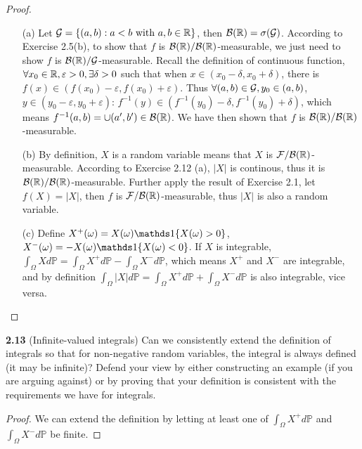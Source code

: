 \begin{proof}
\begin{enumerate}
    \item[(a)] Let $\mathcal{G}=\left\{ (a,b): a<b \text{ with } a,b\in \mathbb{R} \right\}$, then $\mathcal{B}(\mathbb{R}) = \sigma(\mathcal{G})$. According to Exercise 2.5(b), to show that $f$ is $\mathcal{B}(\mathbb{R})/\mathcal{B}(\mathbb{R})$-measurable, we just need to show $f$ is $\mathcal{B}(\mathbb{R})/\mathcal{G}$-measurable. Recall the definition of continuous function, $\forall x_0 \in \mathbb{R}, \varepsilon>0, \exists \delta>0$ such that when $x \in (x_0-\delta,x_0+\delta)$, there is $f(x)\in (f(x_0)-\varepsilon,f(x_0)+\varepsilon)$. Thus $\forall (a,b)\in \mathcal{G}, y_0 \in (a,b)$, $y \in (y_0 - \varepsilon, y_0+\varepsilon)$: $f^{-1}(y) \in (f^{-1}(y_0)-\delta,f^{-1}(y_0)+\delta)$, which means $f^{-1}(a,b) = \cup (a',b') \in \mathcal{B}(\mathbb{R})$. We have then shown that $f$ is $\mathcal{B}(\mathbb{R})/\mathcal{B}(\mathbb{R})$-measurable.

    \item[(b)] By definition, $X$ is a random variable means that $X$ is $\mathcal{F}/\mathcal{B}(\mathbb{R})$-measurable. According to Exercise 2.12 (a), $|X|$ is continous, thus it is $\mathcal{B}(\mathbb{R})/\mathcal{B}(\mathbb{R})$-measurable. Further apply the result of Exercise 2.1, let $f(X)=|X|$, then $f$ is $\mathcal{F}/\mathcal{B}(\mathbb{R})$-measurable, thus $|X|$ is also a random variable. 

    \item[(c)] Define $X^{+}(\omega) = X(\omega) \bOne{X(\omega)>0}$, $X^{-}(\omega) = -X(\omega) \bOne{X(\omega)<0}$. If $X$ is integrable, $\int_{\Omega} X d\mathbb{P} = \int_{\Omega} X^{+} d\mathbb{P} - \int_{\Omega} X^{-} d\mathbb{P} $, which means $X^{+}$ and $X^{-}$ are integrable, and by definition $\int_{\Omega} |X| d\mathbb{P} = \int_{\Omega} X^{+} d\mathbb{P} + \int_{\Omega} X^{-} d\mathbb{P} $ is also integrable, vice versa.

\end{enumerate}
\end{proof}


\noindent\textbf{2.13} (Infinite-valued integrals) Can we consistently extend the definition of integrals so that for non-negative random variables, the integral is always defined (it may be infinite)? Defend your view by either constructing an example (if you are arguing against) or by proving that your definition is consistent with the requirements we have for integrals.
\begin{proof} 
We can extend the definition by letting at least one of $\int_{\Omega} X^{+} d\mathbb{P}$ and $\int_{\Omega} X^{-} d\mathbb{P}$ be finite.
\end{proof}

